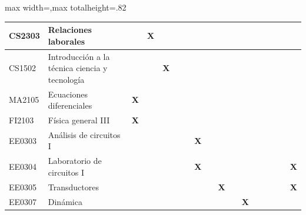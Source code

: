 \begin{center}
\begin{adjustbox}{max width=\textwidth,max totalheight=.82\textheight}
\begin{tabular}{|l|p{4.6cm}|c|c|c|c|c|c|c|c|c|c|c|c|c|c|c|}
\rowcolor{azulTabla}
CS2303 & Relaciones laborales & \textbf{ } & \textbf{X} & \textbf{ } & \textbf{ } & \textbf{ } & \textbf{ } & \textbf{ } & \textbf{ } & \textbf{ } & \textbf{ } & \textbf{ } & \textbf{ } & \textbf{ } & \textbf{ } & \textbf{ } \\ \hline
CS1502 & Introducción a la técnica ciencia y tecnología & \textbf{ } & \textbf{ } & \textbf{X} & \textbf{ } & \textbf{ } & \textbf{ } & \textbf{ } & \textbf{ } & \textbf{ } & \textbf{ } & \textbf{ } & \textbf{ } & \textbf{ } & \textbf{ } & \textbf{ } \\ \hline
\rowcolor{azulTabla}
MA2105 & Ecuaciones diferenciales & \textbf{X} & \textbf{ } & \textbf{ } & \textbf{ } & \textbf{ } & \textbf{ } & \textbf{ } & \textbf{ } & \textbf{ } & \textbf{ } & \textbf{ } & \textbf{ } & \textbf{ } & \textbf{ } & \textbf{ } \\ \hline
FI2103 & Física general III & \textbf{X} & \textbf{ } & \textbf{ } & \textbf{ } & \textbf{ } & \textbf{ } & \textbf{ } & \textbf{ } & \textbf{ } & \textbf{ } & \textbf{ } & \textbf{ } & \textbf{ } & \textbf{ } & \textbf{ } \\ \hline
\rowcolor{azulTabla}
EE0303 & Análisis de circuitos I & \textbf{ } & \textbf{ } & \textbf{ } & \textbf{ } & \textbf{ } & \textbf{X} & \textbf{ } & \textbf{ } & \textbf{ } & \textbf{ } & \textbf{ } & \textbf{ } & \textbf{ } & \textbf{ } & \textbf{ } \\ \hline
EE0304 & Laboratorio de circuitos I & \textbf{ } & \textbf{ } & \textbf{ } & \textbf{ } & \textbf{ } & \textbf{X} & \textbf{ } & \textbf{ } & \textbf{ } & \textbf{ } & \textbf{ } & \textbf{ } & \textbf{ } & \textbf{ } & \textbf{X} \\ \hline
\rowcolor{azulTabla}
EE0305 & Transductores & \textbf{ } & \textbf{ } & \textbf{ } & \textbf{ } & \textbf{ } & \textbf{ } & \textbf{ } & \textbf{X} & \textbf{ } & \textbf{ } & \textbf{ } & \textbf{ } & \textbf{ } & \textbf{ } & \textbf{X} \\ \hline
EE0307 & Dinámica & \textbf{ } & \textbf{ } & \textbf{ } & \textbf{ } & \textbf{ } & \textbf{ } & \textbf{ } & \textbf{ } & \textbf{ } & \textbf{X} & \textbf{ } & \textbf{ } & \textbf{ } & \textbf{ } & \textbf{ } \\ \hline
\end{tabular}
\end{adjustbox}
\end{center}
